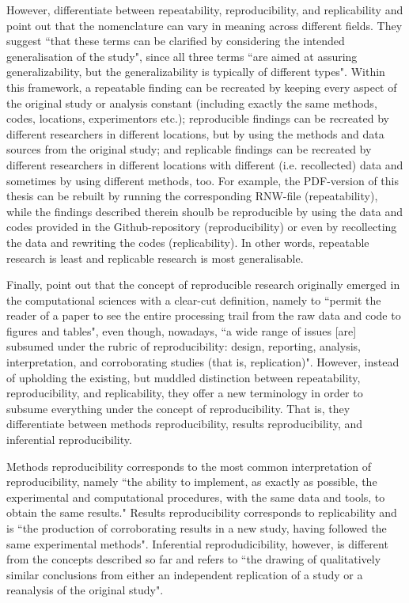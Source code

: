 \documentclass[11pt, a4paper,twoside]{report}\usepackage[]{graphicx}\usepackage[]{color}
\begin{document}
However, \cite{kenett2015clarifying} differentiate between repeatability, reproducibility, and replicability and point out that the nomenclature can vary in meaning across different fields. They suggest ``that these terms can be clarified by considering the intended generalisation of the study", since all three terms ``are aimed at assuring generalizability, but the generalizability is typically of different types". Within this framework, a repeatable finding can be recreated by keeping every aspect of the original study or analysis constant (including exactly the same methods, codes, locations, experimentors etc.); reproducible findings can be recreated by different researchers in different locations, but by using the methods and data sources from the original study; and replicable findings can be recreated by different researchers in different locations with different (i.e. recollected) data and sometimes by using different methods, too. For example, the PDF-version of this thesis can be rebuilt by running the corresponding RNW-file (repeatability), while the findings described therein shoulb be reproducible by using the data and codes provided in the Github-repository (reproducibility) or even by recollecting the data and rewriting the codes (replicability). In other words, repeatable research is least and replicable research is most generalisable.

Finally, \cite{goodman_what_2016} point out that the concept of reproducible research originally emerged in the computational sciences with a clear-cut definition, namely to ``permit the reader of a paper to see the entire processing trail from the raw data and code to figures and tables", even though, nowadays, ``a wide range of issues [are] subsumed under the rubric of reproducibility: design, reporting, analysis, interpretation, and corroborating studies (that is, replication)". However, instead of upholding the existing, but muddled distinction between repeatability, reproducibility, and replicability, they offer a new terminology in order to subsume everything under the concept of reproducibility. That is, they differentiate between methods reproducibility, results reproducibility, and inferential reproducibility. 

Methods reproducibility corresponds to the most common interpretation of reproducibility, namely ``the ability to implement, as exactly as possible, the experimental and computational procedures, with the same data and tools, to obtain the same results." Results reproducibility corresponds to replicability and is ``the production of corroborating results in a new study, having followed the same experimental methods". Inferential reprodudicibility, however, is different from the concepts described so far and refers to ``the drawing of qualitatively similar conclusions from either an independent replication of a study or a reanalysis of the original study".
\end{document}
